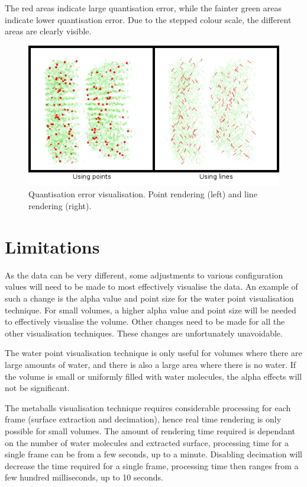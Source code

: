 The red areas indicate large quantisation error, while the fainter green areas
indicate lower quantisation error. Due to the stepped colour scale, the
different areas are clearly visible.

\begin{figure}
  \begin{center}
    \includegraphics[width=120mm]{quanterror}
  \end{center}
  \caption{Quantisation error visualisation. Point rendering (left) and line
  rendering (right).}
  \label{fig:implementation_quanterror}
\end{figure}



\section{Limitations}
\label{sec:implementation_limitations}

As the data can be very different, some adjustments to various configuration
values will need to be made to most effectively visualise the data. An example
of such a change is the alpha value and point size for the water point
visualisation technique. For small volumes, a higher alpha value and point size
will be needed to effectively visualise the volume. Other changes need to be
made for all the other visualisation techniques. These changes are
unfortunately unavoidable.

The water point visualisation technique is only useful for volumes where there
are large amounts of water, and there is also a large area where there is no
water. If the volume is small or uniformly filled with water molecules, the
alpha effects will not be significant.

The metaballs visualisation technique requires considerable processing for each
frame (surface extraction and decimation), hence real time rendering is only
possible for small volumes. The amount of rendering time required is dependant
on the number of water molecules and extracted surface, processing time for a
single frame can be from a few seconds, up to a minute. Disabling decimation
will decrease the time required for a single frame, processing time then ranges
from a few hundred milliseconds, up to 10 seconds.

